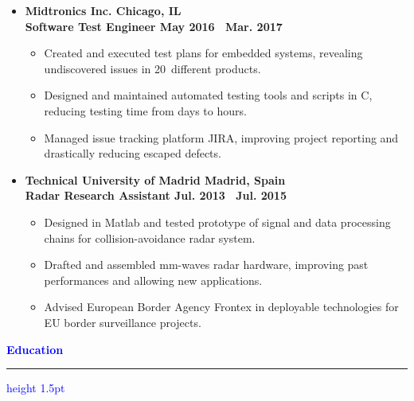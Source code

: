 \documentclass[10pt, letterpaper]{letter}
\def\myplus{\hspace{-.3em}\raisebox{.4ex}{ \tiny +}}
\def\csharp{C\nolinebreak[4]\hspace{-.3em}\raisebox{.25ex}{ \small \#}}
\begin{document}
\begin{itemize}[label=$\bullet$, leftmargin=1em]
    \item
    \textbf{Midtronics Inc. \hfill Chicago, IL}\vspace{2pt}\\
    \textbf{Software Test Engineer \hfill May 2016 \textendash\ Mar. 2017}\vspace{2pt}
    \begin{itemize}[nosep, leftmargin=1.15em]
	\item Created and executed test plans for embedded systems, revealing undiscovered issues in 20\myplus\ different products.
	\item Designed and maintained automated testing tools and scripts in \csharp, reducing testing time from days to hours.
        \item Managed issue tracking platform JIRA, improving project reporting and drastically reducing escaped defects.
    \end{itemize}

\vfill

    \item
    \textbf{Technical University of Madrid \hfill Madrid, Spain}\vspace{2pt}\\
    \textbf{Radar Research Assistant \hfill Jul. 2013 \textendash\ Jul. 2015}\vspace{2pt}
    \begin{itemize}[nosep, leftmargin=1.15em]
	\item Designed in Matlab and tested prototype of signal and data processing chains for collision-avoidance radar system.
	\item Drafted and assembled mm-waves radar hardware, improving past performances and allowing new applications.
        \item Advised European Border Agency Frontex in deployable technologies for EU border surveillance projects.
    \end{itemize}

\end{itemize}

\vfill


\textcolor{Blue}{
    \large\textbf{Education}
    \vspace{3pt}
    \hrule height 1.5pt
}
\end{document}

